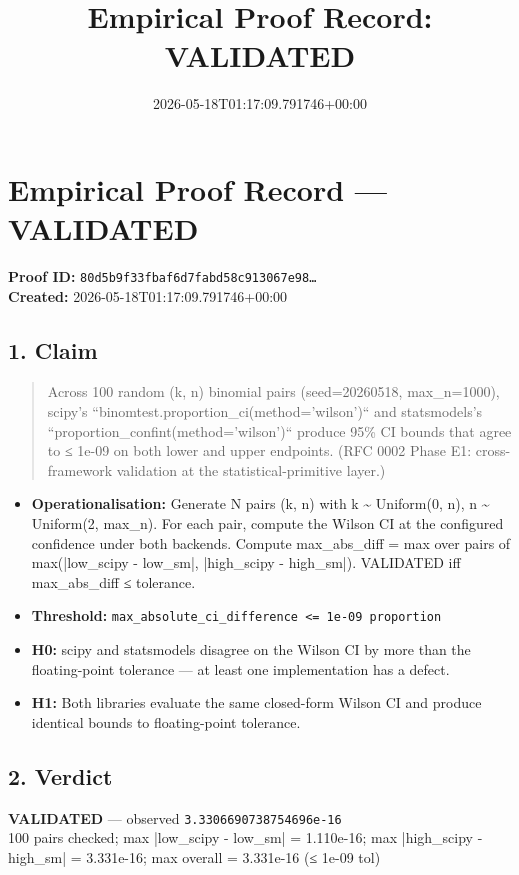 \documentclass{article}
\title{Empirical Proof Record: VALIDATED}
\date{2026-05-18T01:17:09.791746+00:00}
\begin{document}
\maketitle
\section*{Empirical Proof Record --- \textcolor{validated}{\textbf{VALIDATED}}}
\textbf{Proof ID:} \texttt{80d5b9f33fbaf6d7fabd58c913067e98\dots}\\
\textbf{Created:} 2026-05-18T01:17:09.791746+00:00
\subsection*{1. Claim}
\begin{quote}Across 100 random (k, n) binomial pairs (seed=20260518, max\_n=1000), scipy's ``binomtest.proportion\_ci(method='wilson')`` and statsmodels's ``proportion\_confint(method='wilson')`` produce 95\% CI bounds that agree to ≤ 1e-09 on both lower and upper endpoints. (RFC 0002 Phase E1: cross-framework validation at the statistical-primitive layer.)\end{quote}
\begin{itemize}
\item \textbf{Operationalisation:} Generate N pairs (k, n) with k \textasciitilde{} Uniform(0, n), n \textasciitilde{} Uniform(2, max\_n). For each pair, compute the Wilson CI at the configured confidence under both backends. Compute max\_abs\_diff = max over pairs of max(|low\_scipy - low\_sm|, |high\_scipy - high\_sm|). VALIDATED iff max\_abs\_diff ≤ tolerance.
\item \textbf{Threshold:} \texttt{max\_absolute\_ci\_difference <= 1e-09 proportion}
\item \textbf{H0:} scipy and statsmodels disagree on the Wilson CI by more than the floating-point tolerance — at least one implementation has a defect.
\item \textbf{H1:} Both libraries evaluate the same closed-form Wilson CI and produce identical bounds to floating-point tolerance.
\end{itemize}
\subsection*{2. Verdict}
\textcolor{validated}{\textbf{VALIDATED}} --- observed \texttt{3.3306690738754696e-16}\\
100 pairs checked; max |low\_scipy - low\_sm| = 1.110e-16; max |high\_scipy - high\_sm| = 3.331e-16; max overall = 3.331e-16 (≤ 1e-09 tol)
\end{document}
